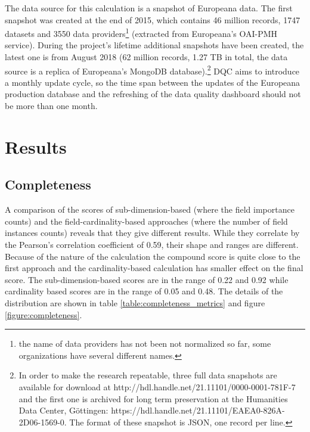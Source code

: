 The data source for this calculation is a snapshot of Europeana data. The first snapshot was created at the end of 2015, which contains 46 million records, 1747 datasets and 3550 data providers\footnote{the name of data providers has not been not normalized so far, some organizations have several different names.} (extracted from Europeana's OAI-PMH service). During the project's lifetime additional snapshots have been created, the latest one is from August 2018 (62 million records, 1.27 TB in total, the data source is a replica of Europeana's MongoDB database).\footnote{In order to make the research repeatable, three full data snapshots are available for download at http://hdl.handle.net/21.11101/0000-0001-781F-7 and the first one is archived for long term preservation at the Humanities Data Center, Göttingen: https://hdl.handle.net/21.11101/EAEA0-826A-2D06-1569-0. The format of these snapshot is JSON, one record per line.} DQC aims to introduce a monthly update cycle, so the time span between the updates of the Europeana production database and the refreshing of the data quality dashboard should not be more than one month.

\section{Results}

\subsection{Completeness}

A comparison of the scores of sub-dimension-based (where the field importance counts) and the field-cardinality-based approaches (where the number of field instances counts) reveals that they give different results. While they correlate by the Pearson's correlation coefficient of 0.59, their shape and ranges are different. Because of the nature of the calculation the compound score is quite close to the first approach and the cardinality-based calculation has smaller effect on the final score. The sub-dimension-based scores are in the range of 0.22 and 0.92 while cardinality based scores are in the range of 0.05 and 0.48. The details of the distribution are shown in table \ref{table:completeness_metrics} and figure \ref{figure:completeness}.


